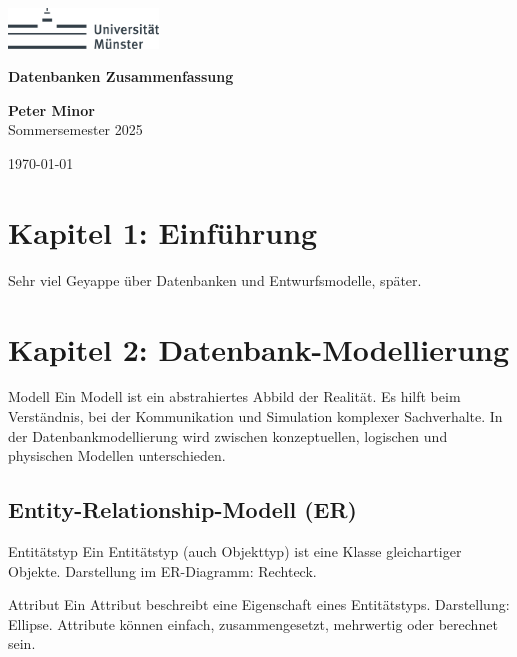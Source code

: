\documentclass{article}
\begin{document}
\begin{titlepage}
    \centering
    \includegraphics[width=0.3\textwidth]{Uni Logo.png} 
    \vspace*{2cm}
    
    {\Large\bfseries Datenbanken Zusammenfassung\par}
    \vspace{1.5cm}
    
    \textbf{Peter Minor}\\
    Sommersemester 2025
    
    \vfill    
    \vspace{1.5cm}
    {\large \today\par}
\end{titlepage}

\tableofcontents

\newpage
\section{Kapitel 1: Einführung}
Sehr viel Geyappe über Datenbanken und Entwurfsmodelle, später.

\section{Kapitel 2: Datenbank-Modellierung}

\begin{block}{Modell}
Ein Modell ist ein abstrahiertes Abbild der Realität. Es hilft beim Verständnis, bei der Kommunikation und Simulation komplexer Sachverhalte. In der Datenbankmodellierung wird zwischen konzeptuellen, logischen und physischen Modellen unterschieden.
\end{block}

\subsection*{Entity-Relationship-Modell (ER)}

\begin{block}{Entitätstyp}
Ein Entitätstyp (auch Objekttyp) ist eine Klasse gleichartiger Objekte. Darstellung im ER-Diagramm: Rechteck.
\end{block}

\begin{block}{Attribut}
Ein Attribut beschreibt eine Eigenschaft eines Entitätstyps. Darstellung: Ellipse. Attribute können einfach, zusammengesetzt, mehrwertig oder berechnet sein.
\end{block}
\end{document}
